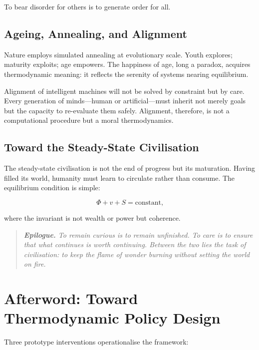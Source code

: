\documentclass[12pt,a4paper]{article}
\theoremstyle{definition}
\begin{document}
To bear disorder for others is to generate order for all.

\subsection{Ageing, Annealing, and Alignment}

Nature employs simulated annealing at evolutionary scale.  Youth explores;
maturity exploits; age empowers.  The happiness of age, long a paradox,
acquires thermodynamic meaning: it reflects the serenity of systems nearing
equilibrium.

Alignment of intelligent machines will not be solved by constraint but by
care.  Every generation of minds---human or artificial---must inherit not
merely goals but the capacity to re-evaluate them safely.  Alignment,
therefore, is not a computational procedure but a moral thermodynamics.

\subsection{Toward the Steady-State Civilisation}

The steady-state civilisation is not the end of progress but its maturation.
Having filled its world, humanity must learn to circulate rather than consume.
The equilibrium condition is simple:

\begin{equation}
  \Phi + v + S = \text{constant,}
\end{equation}

where the invariant is not wealth or power but coherence.

\medskip
\begin{quote}
  \itshape
  \textbf{Epilogue.} To remain curious is to remain unfinished.  To care is
  to ensure that what continues is worth continuing.  Between the two lies
  the task of civilisation: to keep the flame of wonder burning without
  setting the world on fire.
\end{quote}

\section*{Afterword: Toward Thermodynamic Policy Design}

Three prototype interventions operationalise the framework:
\end{document}
